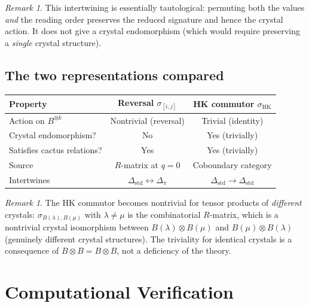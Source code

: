 \documentclass[11pt]{article}
\theoremstyle{remark}
\newtheorem{remark}[theorem]{Remark}
\begin{document}
\begin{remark}
This intertwining is essentially tautological: permuting both the values
\emph{and} the reading order preserves the reduced signature and hence
the crystal action. It does not give a crystal endomorphism (which would
require preserving a \emph{single} crystal structure).
\end{remark}

\subsection{The two representations compared}

\begin{center}
\renewcommand{\arraystretch}{1.3}
\begin{tabular}{@{}lcc@{}}
  \toprule
  Property & Reversal $\sigma_{[i,j]}$ & HK commutor $\sigma_{\mathrm{HK}}$ \\
  \midrule
  Action on $B^{\otimes k}$ & Nontrivial (reversal) & Trivial (identity) \\
  Crystal endomorphism? & No & Yes (trivially) \\
  Satisfies cactus relations? & Yes & Yes (trivially) \\
  Source & $R$-matrix at $q = 0$ & Coboundary category \\
  Intertwines & $\Delta_{\mathrm{std}} \leftrightarrow \Delta_{\pi}$ & $\Delta_{\mathrm{std}} \to \Delta_{\mathrm{std}}$ \\
  \bottomrule
\end{tabular}
\end{center}

\begin{remark}
The HK commutor becomes nontrivial for tensor products of
\emph{different} crystals: $\sigma_{B(\lambda), B(\mu)}$ with
$\lambda \neq \mu$ is the combinatorial $R$-matrix, which is a
nontrivial crystal isomorphism between $B(\lambda) \otimes B(\mu)$ and
$B(\mu) \otimes B(\lambda)$ (genuinely different crystal structures).
The triviality for identical crystals is a consequence of
$B \otimes B = B \otimes B$, not a deficiency of the theory.
\end{remark}

\section{Computational Verification}
\end{document}
